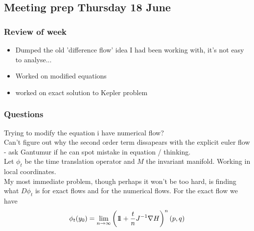 \documentclass[12pt]{article}
\begin{document}
\subsection{Meeting prep Thursday 18 June}
\subsubsection{Review of week}
\begin{itemize}
    \item Dumped the old 'difference flow' idea I had been working with, it's not easy to analyse...
    \item Worked on modified equations
    \item worked on exact solution to Kepler problem
\end{itemize}

\subsubsection{Questions}
Trying to modify the equation i have numerical flow? \\

Can't figure out why the second order term dissapears with the explicit euler flow - ask Gantumur if he can spot mistake in equation / thinking.\\

Let $\phi_t$ be the time translation operator and $M$ the invariant manifold. Working in local coordinates.\\

My most immediate problem, though perhaps it won't be too hard, is finding what $D\phi_t$ is for exact flows and for the numerical flows. For the exact flow we have 
$$\phi_t(y_0) = 
\lim_{n\to\infty} \left( 1\!\!1 + \frac{t}{n}J^{-1}\nabla H \right)^n (p,q)
$$
\end{document}
